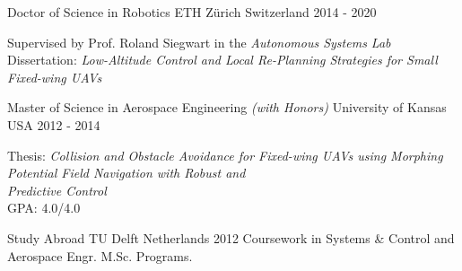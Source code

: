 

\begin{cventries}

  \cveduentry
    {Doctor of Science in Robotics} %
	{}
    {ETH Z\"{u}rich} %
    {Switzerland} %
    {2014 - 2020} %
    {\parbox{\linewidth}{\vspace*{0.1cm}
		Supervised by Prof. Roland Siegwart in the \emph{Autonomous Systems Lab} \\		
		Dissertation: \textit{Low-Altitude Control and Local Re-Planning Strategies for Small Fixed-wing UAVs}
        }
    }
    
  \cveduentry
    {Master of Science in Aerospace Engineering \textit{(with Honors)}} %
    {}
    {University of Kansas} %
    {USA} %
    {2012 - 2014} %
    {\parbox{\linewidth}{\vspace*{0.1cm}
		Thesis: \textit{Collision and Obstacle Avoidance for Fixed-wing UAVs using Morphing Potential Field Navigation with Robust and} \\	
		\hspace*{0.9cm} \textit{Predictive Control} \\
        GPA: 4.0/4.0
        }
    }
    
  \cveduentry
    {Study Abroad} %
    {}
    {TU Delft} %
    {Netherlands} %
    {2012} %
    {Coursework in Systems \& Control and Aerospace Engr. M.Sc. Programs.}
    

\end{cventries}
